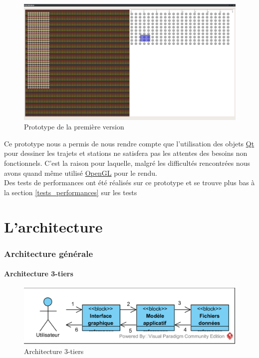 \documentclass[12pt]{article}
\begin{document}
	\begin{figure}[!h]
	\begin{center}
	\includegraphics[scale=0.2]{prototype1_screen_shot.png}
	\caption{Prototype de la première version}
	\end{center}
	\end{figure}		
	
	Ce prototype nous a permis de nous rendre compte que l’utilisation des objets
	\href{https://www.qt.io/}{Qt} pour dessiner les trajets et stations
	ne satisfera pas les attentes des besoins non fonctionnels. C’est la raison pour
	laquelle, malgré les difficultés rencontrées nous avons quand même utilisé
	\href{https://www.khronos.org/registry/OpenGL-Refpages/gl4/}{OpenGL}
	pour le rendu.\\
	
	Des tests de performances ont été réalisés sur ce prototype et se trouve plus bas à la
	section \ref{tests_performances} sur les tests\.\\

\newpage
\part{L'architecture}

	\section{Architecture générale}
		\subsection{Architecture 3-tiers}
		\begin{figure}[!h]
		\begin{center}
		\includegraphics[scale=1]{dia_block_3tiers.png}
		\caption{Architecture 3-tiers}
		\end{center}
		\end{figure}
		
\end{document}
